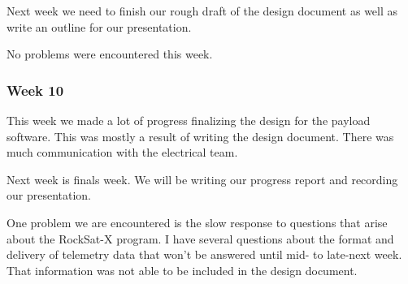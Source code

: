 Next week we need to finish our rough draft of the design document as well as write an outline for our presentation.

No problems were encountered this week.

\subsubsection{Week 10}
This week we made a lot of progress finalizing the design for the \gls{payload} software. This was mostly a result of writing the design document. There was much communication with the electrical team.

Next week is finals week. We will be writing our progress report and recording our presentation.

One problem we are encountered is the slow response to questions that arise about the RockSat-X program. I have several questions about the format and delivery of telemetry data that won't be answered until mid- to late-next week. That information was not able to be included in the design document.
